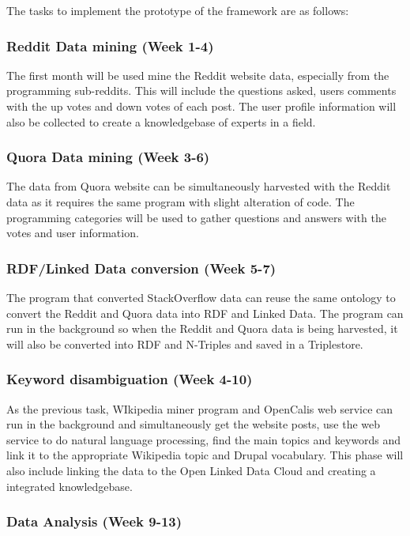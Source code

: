 The tasks to implement the prototype of the framework are as follows:

\subsubsection{Reddit Data mining (Week 1-4)}

The first month will be used mine the Reddit website data, especially from the programming sub-reddits. This will include the questions asked, users comments with the up votes and down votes of each post. The user profile information will also be collected to create a knowledgebase of experts in a field.

\subsubsection{Quora Data mining (Week 3-6)}

The data from Quora website can be simultaneously harvested with the Reddit data as it requires the same program with slight alteration of code. The programming categories will be used to gather questions and answers with the votes and user information.

\subsubsection{RDF/Linked Data conversion (Week 5-7)}

The program that converted StackOverflow data can reuse the same ontology to convert the Reddit and Quora data into RDF and Linked Data. The program can run in the background so when the Reddit and Quora data is being harvested, it will also be converted into RDF and N-Triples and saved in a Triplestore.

\subsubsection{Keyword disambiguation (Week 4-10)}

As the previous task, WIkipedia miner program and OpenCalis web service can run in the background and simultaneously get the website posts, use the web service to do natural language processing, find the main topics and keywords and link it to the appropriate Wikipedia topic and Drupal vocabulary. This phase will also include linking the data to the Open Linked Data Cloud and creating a integrated knowledgebase.

\subsubsection{Data Analysis (Week 9-13)}

